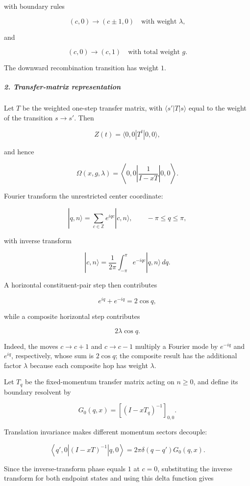 with boundary rules

\[
(c,0)\longrightarrow(c\pm1,0) \quad\text{with weight }\lambda,
\]

and

\[
(c,0)\longrightarrow(c,1) \quad\text{with total weight }g.
\]

The downward recombination transition has weight $1$.

\subparagraph*{2. Transfer-matrix representation}

Let $T$ be the weighted one-step transfer matrix, with $\langle s'|T|s\rangle$ equal to the weight of the transition $s\to s'$. Then

\[
Z(t)=\langle 0,0|T^t|0,0\rangle,
\]

and hence

\[
\Omega(x,g,\lambda) = \left\langle 0,0\left| \frac{1}{I-xT} \right|0,0\right\rangle.
\]

Fourier transform the unrestricted center coordinate:

\[
|q,n\rangle = \sum_{c\in\mathbb Z}e^{iqc}|c,n\rangle, \qquad -\pi\leq q\leq\pi,
\]

with inverse transform

\[
|c,n\rangle=\frac{1}{2\pi}\int_{-\pi}^{\pi}e^{-iqc}|q,n\rangle\,dq.
\]

A horizontal constituent-pair step then contributes

\[
e^{iq}+e^{-iq}=2\cos q,
\]

while a composite horizontal step contributes

\[
2\lambda\cos q.
\]

Indeed, the moves $c\to c+1$ and $c\to c-1$ multiply a Fourier mode by $e^{-iq}$ and $e^{iq}$, respectively, whose sum is $2\cos q$; the composite result has the additional factor $\lambda$ because each composite hop has weight $\lambda$.

Let $T_q$ be the fixed-momentum transfer matrix acting on $n\geq0$, and define its boundary resolvent by

\[
G_0(q,x)=\left[(I-xT_q)^{-1}\right]_{0,0}.
\]

Translation invariance makes different momentum sectors decouple:

\[
\left\langle q',0\left|(I-xT)^{-1}\right|q,0\right\rangle
=2\pi\delta(q-q')G_0(q,x).
\]

Since the inverse-transform phase equals $1$ at $c=0$, substituting the inverse transform for both endpoint states and using this delta function gives

